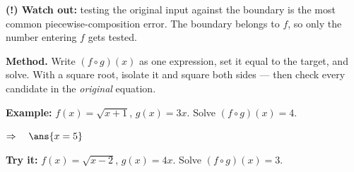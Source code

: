 \documentclass[12pt]{article}
\begin{document}
\begin{watchoutbox}
\textbf{(!) Watch out:} testing the original input against the boundary is the most common piecewise-composition error. The boundary belongs to $f$, so only the number entering $f$ gets tested.
\end{watchoutbox}


\begin{formulabox}
\textbf{Method.} Write $(f \circ g)(x)$ as one expression, set it equal to the target, and solve. With a square root, isolate it and square both sides --- then check every candidate in the \emph{original} equation.
\end{formulabox}

\begin{examplebox}
\textbf{Example:} \quad $f(x) = \sqrt{x + 1}$, $g(x) = 3x$. Solve $(f \circ g)(x) = 4$.

$\Rightarrow\quad \ans{x = 5}$
\end{examplebox}

\begin{tryitbox}
\textbf{Try it:} \quad $f(x) = \sqrt{x - 2}$, $g(x) = 4x$. Solve $(f \circ g)(x) = 3$.\\[2pt]
\end{tryitbox}
\end{document}

